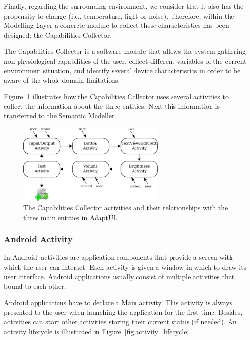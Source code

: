 Finally, regarding the surrounding environment, we consider that it also has the 
propensity to change (i.e., temperature, light or noise). Therefore, within the 
Modelling Layer a concrete module to collect these characteristics has been 
designed: the Capabilities Collector.

The Capabilities Collector is a software module that allows the system gathering 
non physiological capabilities of the user, collect different variables of the 
current environment situation, and identify several device characteristics in 
order to be aware of the whole domain limitations.

Figure~\ref{fig:capabilities_collector_flow} illustrates how the Capabilities 
Collector uses several activities to collect the information about the three 
entities. Next this information is transferred to the Semantic Modeller.

\begin{figure}
\centering
\includegraphics[width=0.65\textwidth]{capabilities_collector_flow.pdf}
\caption{The Capabilities Collector activities and their relationships with the
three main entities in AdaptUI.}
\label{fig:capabilities_collector_flow}
\end{figure}


\subsubsection{Android Activity}
\label{sec:activities}

In Android, activities are application components that provide a screen with
which the user can interact. Each activity is given a window in which to draw
its user interface. Android applications usually consist of multiple activities 
that bound to each other. 

Android applications have to declare a Main activity. This activity is always
presented to the user when launching the application for the first time. Besides,
activities can start other activities storing their current status (if needed).
An activity lifecycle is illustrated in Figure~\ref{fig:activity_lifecycle}.


